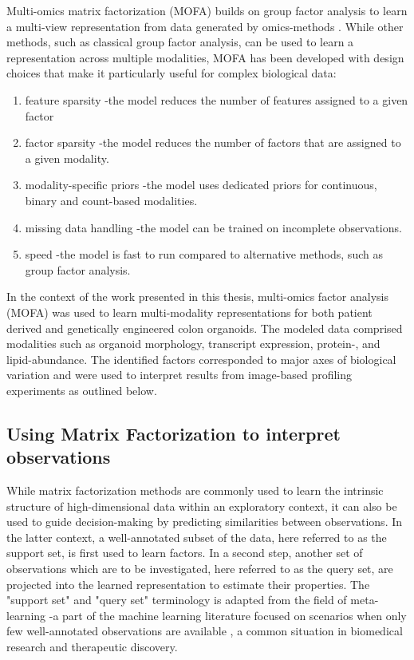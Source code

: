 \begin{flushleft}
Multi-omics matrix factorization (MOFA) builds on group factor analysis to learn a multi-view representation from data generated by omics-methods \parencite{argelaguetMultiOmicsFactorAnalysis2018b, argelaguetMOFAStatisticalFramework2020a}. While other methods, such as classical group factor analysis, can be used to learn a representation across multiple modalities, MOFA has been developed with design choices that make it particularly useful for complex biological data:

\begin{enumerate}
    \item feature sparsity -the model reduces the number of features assigned to a given factor
    \item factor sparsity -the model reduces the number of factors that are assigned to a given modality.
    \item modality-specific priors -the model uses dedicated priors for continuous, binary and count-based modalities.
    \item missing data handling -the model can be trained on incomplete observations.
    \item speed -the model is fast to run compared to alternative methods, such as group factor analysis.
\end{enumerate}
 
\bigbreak
In the context of the work presented in this thesis, multi-omics factor analysis (MOFA) was used to learn multi-modality representations for both patient derived and genetically engineered colon organoids. The modeled data comprised modalities such as organoid morphology, transcript expression, protein-, and lipid-abundance. The identified factors corresponded to major axes of biological variation and were used to interpret results from image-based profiling experiments as outlined below. 

\subsection{Using Matrix Factorization to interpret observations}

While matrix factorization methods are commonly used to learn the intrinsic structure of high-dimensional data within an exploratory context, it can also be used to guide decision-making by predicting similarities between observations. In the latter context, a well-annotated subset of the data, here referred to as the support set, is first used to learn factors. In a second step, another set of observations which are to be investigated, here referred to as the query set, are projected into the learned representation to estimate their properties. The "support set" and "query set" terminology is adapted from the field of meta-learning -a part of the machine learning literature focused on scenarios when only few well-annotated observations are available \parencite{hospedalesMetaLearningNeuralNetworks2020}, a common situation in biomedical research and therapeutic discovery. 
\par


\end{flushleft}
